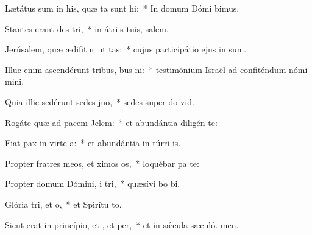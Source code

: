 \item Lætátus sum in his, quæ ta sunt hi:~* In domum Dómi bimus.
\item Stantes erant des tri,~* in átriis tuis, salem.
\item Jerúsalem, quæ ædifitur ut tas:~* cujus participátio ejus in sum.
\item Illuc enim ascendérunt tribus, bus ni:~* testimónium Israël ad confiténdum nómi mini.
\item Quia illic sedérunt sedes  juo,~* sedes super do vid.
\item Rogáte quæ ad pacem  Jelem:~* et abundántia diligén te:
\item Fiat pax in virte a:~* et abundántia in túrri is.
\item Propter fratres meos, et ximos os,~* loquébar pa  te:
\item Propter domum Dómini, i tri,~* quæsívi bo bi.
\item Glória tri, et o,~* et Spirítu to.
\item Sicut erat in princípio, et , et per,~* et in sǽcula sæculó. men.
